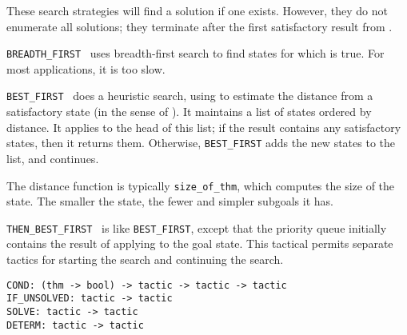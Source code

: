 \begin{isabellebody}
\begin{isamarkuptext}
  These search strategies will find a solution if one exists.
  However, they do not enumerate all solutions; they terminate after
  the first satisfactory result from .

  \begin{description}

  \item \verb|BREADTH_FIRST|~ uses breadth-first
  search to find states for which  is true.  For most
  applications, it is too slow.

  \item \verb|BEST_FIRST|~ does a heuristic
  search, using  to estimate the distance from a
  satisfactory state (in the sense of ).  It maintains a
  list of states ordered by distance.  It applies  to the
  head of this list; if the result contains any satisfactory states,
  then it returns them.  Otherwise, \verb|BEST_FIRST| adds the new
  states to the list, and continues.

  The distance function is typically \verb|size_of_thm|, which computes
  the size of the state.  The smaller the state, the fewer and simpler
  subgoals it has.

  \item \verb|THEN_BEST_FIRST|~ is like
  \verb|BEST_FIRST|, except that the priority queue initially contains
  the result of applying  to the goal state.  This
  tactical permits separate tactics for starting the search and
  continuing the search.

  \end{description}%
\end{isamarkuptext}%
\isamarkuptrue%
%
\isamarkuptrue%
%
\begin{isamarkuptext}%
\begin{mldecls}
  \verb|COND: (thm -> bool) -> tactic -> tactic -> tactic| \\
  \verb|IF_UNSOLVED: tactic -> tactic| \\
  \verb|SOLVE: tactic -> tactic| \\
  \verb|DETERM: tactic -> tactic| \\
  \end{mldecls}


\end{isamarkuptext}
\end{isabellebody}
